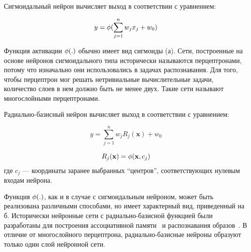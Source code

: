 Сигмоидальный нейрон вычисляет выход в соответствии с уравнением:

\begin{equation}
\label{eq:sigm_neuron_output}
y=\fa(\sum_{j=1}^nw_j x_j+w_0)
\end{equation}

Функция активации $\phi(.)$ обычно имеет вид сигмоиды
(а).  Сети, построенные на основе нейронов
сигмоидального типа исторически называются перцептронами, потому что
изначально они использовались в задачах распознавания.  Для того,
чтобы перцептрон мог решать нетривиальные вычислительные задачи,
количество слоев в нем должно быть не менее двух.  Такие сети называют
многослойными перцептронами.

Радиально-базисный нейрон вычисляет выход в соответствии с уравнением:

\begin{equation}
\label{eq:rbf_neuron_output}
y=\sum_{j=1}^nw_j R_j(\mathbf{x})+w_0
\end{equation}

\begin{equation}
\label{eq:rb_function}
R_j(\mathbf{x})=\fa(\mathbf{x},c_j)
\end{equation} где $c_j$ --- координаты заранее выбранных ``центров'',
соответствующих нулевым входам нейрона.

Функция $\phi(.)$, как и в случае с сигмоидальным нейроном, может быть
реализована различными способами, но имеет характерный вид,
приведенный на б.  Исторически нейронные сети с
радиально-базисной функцией были разработаны для построения
ассоциативной памяти~\cite{koh80} и распознавания
образов~\cite{wasser92}.  В отличие от многослойного перцептрона,
радиально-базисные нейроны образуют только один слой нейронной сети.

